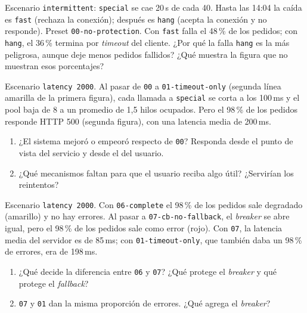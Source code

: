 \documentclass[variant=guia,cover=institutional,mode=screen]{ua-engineering-v6-article}
\begin{document}
\begin{uaexercise}
Escenario \texttt{intermittent}: \texttt{special} se cae 20\,s de cada 40. Hasta las 14:04 la caída es \texttt{fast} (rechaza la conexión); después es \texttt{hang} (acepta la conexión y no responde). Preset \texttt{00-no-protection}. Con \texttt{fast} falla el 48\,\% de los pedidos; con \texttt{hang}, el 36\,\% termina por \emph{timeout} del cliente.
¿Por qué la falla \texttt{hang} es la más peligrosa, aunque deje menos pedidos fallidos? ¿Qué muestra la figura que no muestran esos porcentajes?
\end{uaexercise}

\begin{uaexercise}
Escenario \texttt{latency 2000}. Al pasar de \texttt{00} a \texttt{01-timeout-only} (segunda línea amarilla de la primera figura), cada llamada a \texttt{special} se corta a los 100\,ms y el pool baja de 8 a un promedio de 1,5 hilos ocupados. Pero el 98\,\% de los pedidos responde HTTP 500 (segunda figura), con una latencia media de 200\,ms.
\begin{enumerate}
\item ¿El sistema mejoró o empeoró respecto de \texttt{00}? Responda desde el punto de vista del servicio y desde el del usuario.
\item ¿Qué mecanismos faltan para que el usuario reciba algo útil? ¿Servirían los reintentos?
\end{enumerate}
\end{uaexercise}

\begin{uaexercise}
Escenario \texttt{latency 2000}. Con \texttt{06-complete} el 98\,\% de los pedidos sale degradado (amarillo) y no hay errores. Al pasar a \texttt{07-cb-no-fallback}, el \emph{breaker} se abre igual, pero el 98\,\% de los pedidos sale como error (rojo). Con \texttt{07}, la latencia media del servidor es de 85\,ms; con \texttt{01-timeout-only}, que también daba un 98\,\% de errores, era de 198\,ms.
\begin{enumerate}
\item ¿Qué decide la diferencia entre \texttt{06} y \texttt{07}? ¿Qué protege el \emph{breaker} y qué protege el \emph{fallback}?
\item \texttt{07} y \texttt{01} dan la misma proporción de errores. ¿Qué agrega el \emph{breaker}?
\end{enumerate}
\end{uaexercise}
\end{document}
